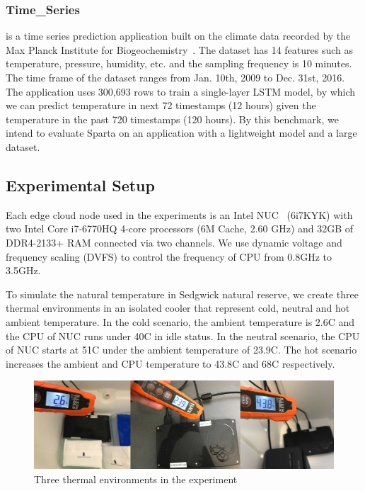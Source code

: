 \subsubsection{Time\_Series} is a time series prediction application built on the climate data recorded by the Max Planck Institute for Biogeochemistry~\cite{ref:jena}. The dataset has 14 features such as temperature, pressure, humidity, etc. and the sampling frequency is 10 minutes. The time frame of the dataset ranges from Jan. 10th, 2009 to Dec. 31st, 2016. The application uses 300,693 rows to train a single-layer LSTM model, by which we can predict temperature in next 72 timestamps (12 hours) given the temperature in the past 720 timestamps (120 hours). By this benchmark, we intend to evaluate Sparta on an application with a lightweight model and a large dataset.


\subsection{Experimental Setup}

Each edge cloud node used in the experiments is an Intel NUC~\cite{ref:nuc} (6i7KYK) with two Intel Core i7-6770HQ 4-core processors (6M Cache, 2.60 GHz) and 32GB of DDR4-2133+ RAM connected via two channels. We use dynamic voltage and frequency scaling (DVFS) to control the frequency of CPU from 0.8GHz to 3.5GHz.

To simulate the natural temperature in Sedgwick natural reserve, we create three thermal environments in an isolated cooler that represent cold, neutral and hot ambient temperature. In the cold scenario, the ambient temperature is 2.6\degree C and the CPU of NUC runs under 40\degree C in idle status. In the neutral scenario, the CPU of NUC starts at 51\degree C under the ambient temperature of 23.9\degree C. The hot scenario increases the ambient and CPU temperature to 43.8\degree C and 68\degree C respectively.

\begin{figure}
\includegraphics[width=\textwidth]{figures/thermal.jpg}
\caption{Three thermal environments in the experiment} \label{cold}
\end{figure}

